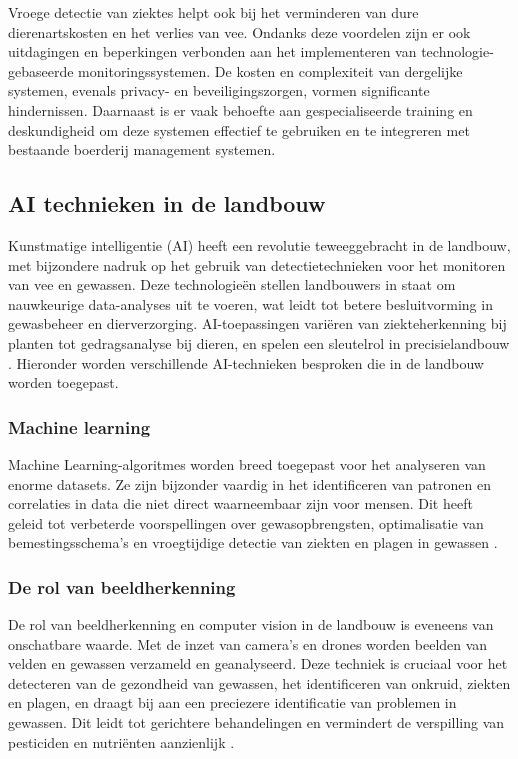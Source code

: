 Vroege detectie van ziektes helpt ook bij het verminderen van dure dierenartskosten en het verlies van vee\autocite{ToAgriculture}\autocite{IntuzIoT}.
\newline
Ondanks deze voordelen zijn er ook uitdagingen en beperkingen verbonden aan het implementeren van technologie-gebaseerde monitoringssystemen. De kosten en complexiteit van dergelijke systemen, evenals privacy- en beveiligingszorgen, vormen significante hindernissen. 
Daarnaast is er vaak behoefte aan gespecialiseerde training en deskundigheid om deze systemen effectief te gebruiken en te integreren met bestaande boerderij management systemen\autocite{ToAgriculture}\autocite{IntuzIoT}.
\newline

\subsection{AI technieken in de landbouw}
Kunstmatige intelligentie (AI) heeft een revolutie teweeggebracht in de landbouw, met bijzondere nadruk op het gebruik van detectietechnieken voor het monitoren van vee en gewassen. 
Deze technologieën stellen landbouwers in staat om nauwkeurige data-analyses uit te voeren, wat leidt tot betere besluitvorming in gewasbeheer en dierverzorging. AI-toepassingen variëren van ziekteherkenning bij planten tot gedragsanalyse bij dieren, en spelen een sleutelrol in precisielandbouw \autocite{jafar2024revolutionizing}.
Hieronder worden verschillende AI-technieken besproken die in de landbouw worden toegepast.

\subsubsection{Machine learning}
Machine Learning-algoritmes worden breed toegepast voor het analyseren van enorme datasets. Ze zijn bijzonder vaardig in het identificeren van patronen en correlaties in data die niet direct waarneembaar zijn voor mensen. Dit heeft geleid tot verbeterde voorspellingen over gewasopbrengsten, optimalisatie van bemestingsschema's en vroegtijdige detectie van ziekten en plagen in gewassen \autocite{morota2018machine}.

\subsubsection{De rol van beeldherkenning}
De rol van beeldherkenning en computer vision in de landbouw is eveneens van onschatbare waarde. Met de inzet van camera's en drones worden beelden van velden en gewassen verzameld en geanalyseerd. Deze techniek is cruciaal voor het detecteren van de gezondheid van gewassen, het identificeren van onkruid, ziekten en plagen, en draagt bij aan een preciezere identificatie van problemen in gewassen. Dit leidt tot gerichtere behandelingen en vermindert de verspilling van pesticiden en nutriënten aanzienlijk \autocite{morota2018big}.

